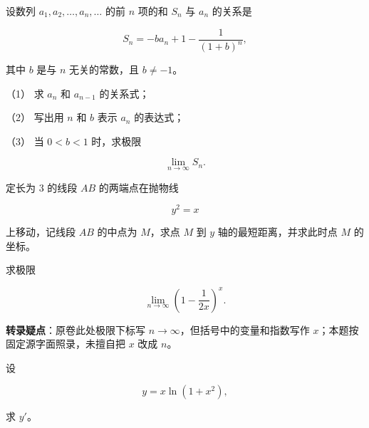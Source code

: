 \begin{question}
设数列 $a_1,a_2,\ldots,a_n,\ldots$ 的前 $n$ 项的和 $S_n$ 与 $a_n$ 的关系是

\nopagebreak[4]
\[
S_n=-ba_n+1-\frac{1}{(1+b)^n},
\]

其中 $b$ 是与 $n$ 无关的常数，且 $b\ne-1$。

（1） 求 $a_n$ 和 $a_{n-1}$ 的关系式；

（2） 写出用 $n$ 和 $b$ 表示 $a_n$ 的表达式；

（3） 当 $0<b<1$ 时，求极限

\nopagebreak[4]
\[
\lim_{n\to\infty}S_n.
\]

\end{question}
\begin{question}
定长为 $3$ 的线段 $AB$ 的两端点在抛物线

\nopagebreak[4]
\[
y^2=x
\]

上移动，记线段 $AB$ 的中点为 $M$，求点 $M$ 到 $y$ 轴的最短距离，并求此时点 $M$ 的坐标。

\end{question}

\begin{question}
求极限

\nopagebreak[4]
\[
\lim_{n\to\infty}\left(1-\frac1{2x}\right)^x.
\]

\begin{gktip}
\textbf{转录疑点}：原卷此处极限下标写 $n\to\infty$，但括号中的变量和指数写作 $x$；本题按固定源字面照录，未擅自把 $x$ 改成 $n$。
\end{gktip}

\end{question}
\begin{question}
设

\nopagebreak[4]
\[
y=x\ln(1+x^2),
\]

求 $y'$。

\end{question}